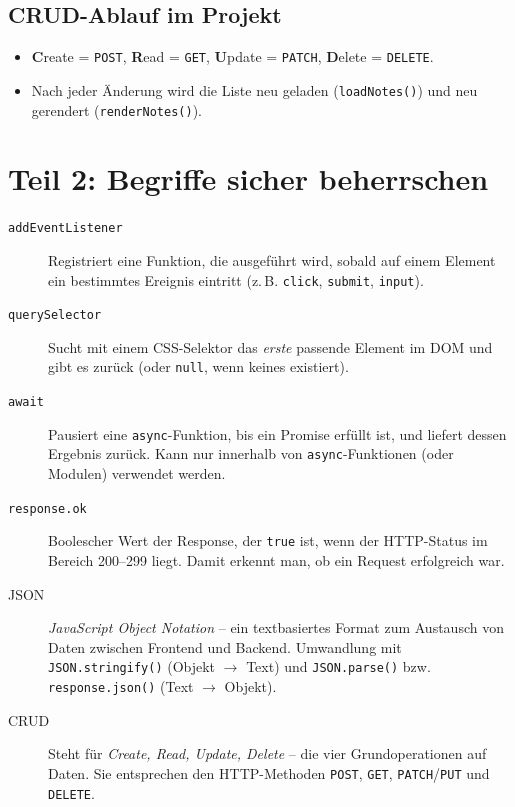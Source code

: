 \documentclass[a4paper,12pt]{article}
\begin{document}
\subsection*{CRUD-Ablauf im Projekt}
\begin{itemize}
    \item \textbf{C}reate = \texttt{POST}, \textbf{R}ead = \texttt{GET}, \textbf{U}pdate = \texttt{PATCH}, \textbf{D}elete = \texttt{DELETE}.
    \item Nach jeder Änderung wird die Liste neu geladen (\texttt{loadNotes()}) und neu gerendert (\texttt{renderNotes()}).
\end{itemize}

\section{Teil 2: Begriffe sicher beherrschen}

\begin{description}
    \item[\texttt{addEventListener}] Registriert eine Funktion, die ausgeführt wird, sobald auf einem Element ein bestimmtes Ereignis eintritt (z.\,B. \texttt{click}, \texttt{submit}, \texttt{input}).
    \item[\texttt{querySelector}] Sucht mit einem CSS-Selektor das \emph{erste} passende Element im DOM und gibt es zurück (oder \texttt{null}, wenn keines existiert).
    \item[\texttt{await}] Pausiert eine \texttt{async}-Funktion, bis ein Promise erfüllt ist, und liefert dessen Ergebnis zurück. Kann nur innerhalb von \texttt{async}-Funktionen (oder Modulen) verwendet werden.
    \item[\texttt{response.ok}] Boolescher Wert der Response, der \texttt{true} ist, wenn der HTTP-Status im Bereich 200--299 liegt. Damit erkennt man, ob ein Request erfolgreich war.
    \item[JSON] \emph{JavaScript Object Notation} -- ein textbasiertes Format zum Austausch von Daten zwischen Frontend und Backend. Umwandlung mit \texttt{JSON.stringify()} (Objekt $\rightarrow$ Text) und \texttt{JSON.parse()} bzw. \texttt{response.json()} (Text $\rightarrow$ Objekt).
    \item[CRUD] Steht für \emph{Create, Read, Update, Delete} -- die vier Grundoperationen auf Daten. Sie entsprechen den HTTP-Methoden \texttt{POST}, \texttt{GET}, \texttt{PATCH}/\texttt{PUT} und \texttt{DELETE}.
\end{description}
\end{document}
